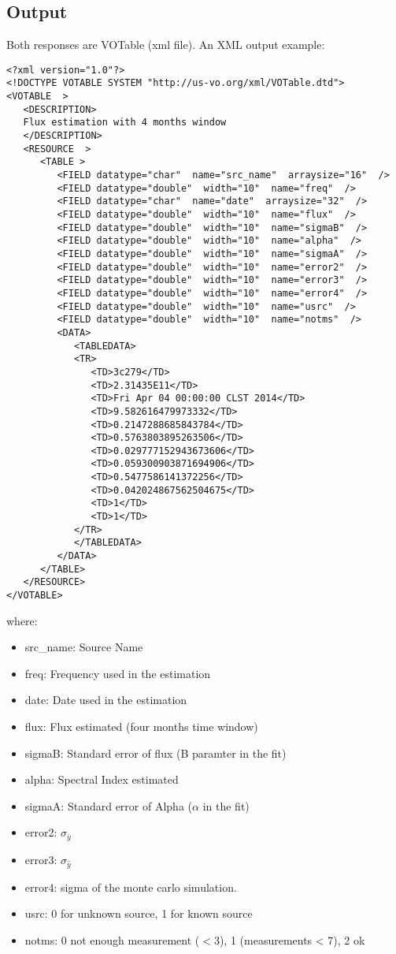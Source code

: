 \documentclass[10pt]{article}
\begin{document}
\subsection{Output}
\noindent Both responses are VOTable (xml file). An XML output example:
\lstset{language=XML}
\begin{lstlisting}
<?xml version="1.0"?>
<!DOCTYPE VOTABLE SYSTEM "http://us-vo.org/xml/VOTable.dtd">
<VOTABLE  >
   <DESCRIPTION>
   Flux estimation with 4 months window
   </DESCRIPTION>
   <RESOURCE  >
      <TABLE >
         <FIELD datatype="char"  name="src_name"  arraysize="16"  />
         <FIELD datatype="double"  width="10"  name="freq"  />
         <FIELD datatype="char"  name="date"  arraysize="32"  />
         <FIELD datatype="double"  width="10"  name="flux"  />
         <FIELD datatype="double"  width="10"  name="sigmaB"  />
         <FIELD datatype="double"  width="10"  name="alpha"  />
         <FIELD datatype="double"  width="10"  name="sigmaA"  />
         <FIELD datatype="double"  width="10"  name="error2"  />
         <FIELD datatype="double"  width="10"  name="error3"  />
         <FIELD datatype="double"  width="10"  name="error4"  />
         <FIELD datatype="double"  width="10"  name="usrc"  />
         <FIELD datatype="double"  width="10"  name="notms"  />
         <DATA>
            <TABLEDATA>
            <TR>
               <TD>3c279</TD>
               <TD>2.31435E11</TD>
               <TD>Fri Apr 04 00:00:00 CLST 2014</TD>
               <TD>9.582616479973332</TD>
               <TD>0.2147288685843784</TD>
               <TD>0.5763803895263506</TD>
               <TD>0.029777152943673606</TD>
               <TD>0.059300903871694906</TD>
               <TD>0.5477586141372256</TD>
               <TD>0.042024867562504675</TD>
               <TD>1</TD>
               <TD>1</TD>
            </TR>
            </TABLEDATA>
         </DATA>
      </TABLE>
   </RESOURCE>
</VOTABLE>
\end{lstlisting}

\noindent where:
\begin{itemize}
    \item src\_name: Source Name
    \item freq: Frequency used in the estimation
    \item date: Date used in the estimation
    \item flux: Flux estimated (four months time window)
    \item sigmaB: Standard error of flux (B paramter in the fit)
    \item alpha: Spectral Index estimated
    \item sigmaA: Standard error of Alpha ($\alpha$ in the fit)
    \item error2: $\sigma_{\bar{y}}$ %
    \item error3: $\sigma_{\hat{y}}$
    \item error4: sigma of the monte carlo simulation.
    \item usrc: 0 for unknown source, 1 for known source
    \item notms: 0 not enough measurement ($<$3), 1 (measurements < 7), 2 ok
\end{itemize}
\end{document}

